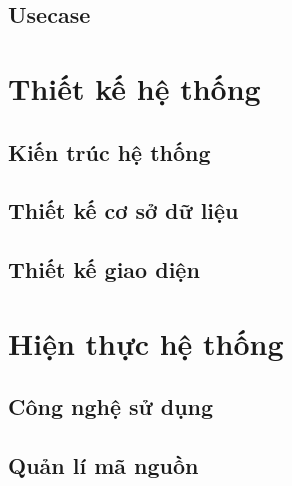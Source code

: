 \documentclass[a4paper]{article}
\begin{document}
\subsection{Usecase}






\newpage
\section{Thiết kế hệ thống}

\subsection{Kiến trúc hệ thống}


\newpage
\subsection{Thiết kế cơ sở dữ liệu}




\subsection{Thiết kế giao diện}
% 

% 

\newpage
\section{Hiện thực hệ thống}
\subsection{Công nghệ sử dụng}


\subsection{Quản lí mã nguồn}

\end{document}
